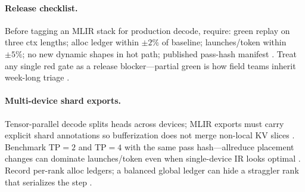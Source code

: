 \paragraph{Release checklist.} Before tagging an MLIR stack for production decode, require: green replay on three ctx lengths; alloc ledger within ${\pm}2\%$ of baseline; launches/token within ${\pm}5\%$; no new dynamic shapes in hot path; published pass-hash manifest \citep{yirage2026,chen2020compilerbasedhardw,patel2025llminference,memoryfloor2026,taxbreak2026,kwon2023vllm,liu2024deepseekv3,amd2024aie,amd2024xdna,dao2022flashattention,dao2023flashdecoding,nvidia2024cudagraphs,nvidia2022hopper,semianalysis2024tma,dlbook}. Treat any single red gate as a release blocker---partial green is how field teams inherit week-long triage \citep{memoryfloor2026,taxbreak2026,yirage2026,patel2025llminference,chen2020compilerbasedhardw,kwon2023vllm,liu2024deepseekv3,amd2024aie,amd2024xdna,dao2022flashattention,dao2023flashdecoding,nvidia2024cudagraphs,nvidia2022hopper,semianalysis2024tma,dlbook}.


\paragraph{Multi-device shard exports.} Tensor-parallel decode splits heads across devices; MLIR exports must carry explicit shard annotations so bufferization does not merge non-local KV slices \citep{liu2024deepseekv3,kwon2023vllm,yirage2026,chen2020compilerbasedhardw,patel2025llminference,memoryfloor2026,taxbreak2026,amd2024aie,amd2024xdna,dao2022flashattention,dao2023flashdecoding,nvidia2024cudagraphs,nvidia2022hopper,semianalysis2024tma,dlbook}. Benchmark TP${=}2$ and TP${=}4$ with the same pass hash---allreduce placement changes can dominate launches/token even when single-device IR looks optimal \citep{liu2024deepseekv3,yirage2026,memoryfloor2026,taxbreak2026,chen2020compilerbasedhardw,patel2025llminference,kwon2023vllm,amd2024aie,amd2024xdna,dao2022flashattention,dao2023flashdecoding,nvidia2024cudagraphs,nvidia2022hopper,semianalysis2024tma,dlbook}. Record per-rank alloc ledgers; a balanced global ledger can hide a straggler rank that serializes the step \citep{memoryfloor2026,taxbreak2026,yirage2026,liu2024deepseekv3,chen2020compilerbasedhardw,patel2025llminference,kwon2023vllm,amd2024aie,amd2024xdna,dao2022flashattention,dao2023flashdecoding,nvidia2024cudagraphs,nvidia2022hopper,semianalysis2024tma,dlbook}.


